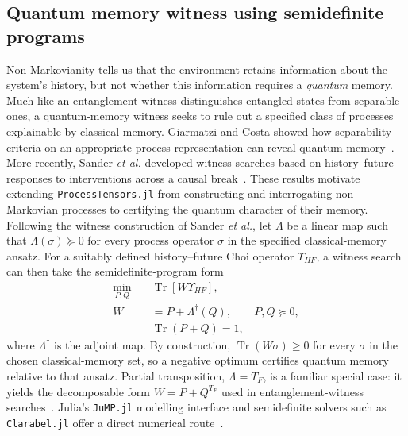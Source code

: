 \subsection{Quantum memory witness using semidefinite programs}
\label{subsec:roadmap-quantum-memory}

Non-Markovianity tells us that the environment retains information about the system's history, but not whether this information requires a \emph{quantum} memory.
Much like an entanglement witness distinguishes entangled states from separable ones, a quantum-memory witness seeks to rule out a specified class of processes explainable by classical memory.
Giarmatzi and Costa showed how separability criteria on an appropriate process representation can reveal quantum memory~\cite{giarmatzi2021witnessing}.
More recently, Sander \emph{et al.} developed witness searches based on history--future responses to interventions across a causal break~\cite{sander2026responses}.
These results motivate extending \texttt{ProcessTensors.jl} from constructing and interrogating non-Markovian processes to certifying the quantum character of their memory.
Following the witness construction of Sander \emph{et al.}, let $\Lambda$ be a linear map such that $\Lambda(\sigma)\succeq0$ for every process operator $\sigma$ in the specified classical-memory ansatz.
For a suitably defined history--future Choi operator $\Upsilon_{HF}$, a witness search can then take the semidefinite-program form
%
\begin{equation}
    \label{eq:memory-witness-sdp}
    \begin{aligned}
        \min_{P,Q}\quad&
        \operatorname{Tr}\!\left[W\Upsilon_{HF}\right],
        \\[-2pt]
        W&=P+\Lambda^\dagger(Q),\qquad P,Q\succeq0,
        \\
        &\operatorname{Tr}(P+Q)=1,
    \end{aligned}
\end{equation}
%
where $\Lambda^\dagger$ is the adjoint map.
By construction, $\operatorname{Tr}(W\sigma)\geq0$ for every $\sigma$ in the chosen classical-memory set, so a negative optimum certifies quantum memory relative to that ansatz.
Partial transposition, $\Lambda=T_F$, is a familiar special case: it yields the decomposable form $W=P+Q^{T_F}$ used in entanglement-witness searches~\cite{giarmatzi2021witnessing}.
Julia's \texttt{JuMP.jl} modelling interface and semidefinite solvers such as \texttt{Clarabel.jl} offer a direct numerical route~\cite{dunning2017jump,goulart2024clarabel}.

